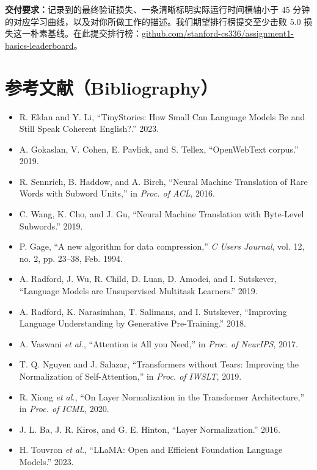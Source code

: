 \textbf{交付要求：}记录到的最终验证损失、一条清晰标明实际运行时间横轴小于 45 分钟的对应学习曲线，以及对你所做工作的描述。我们期望排行榜提交至少击败 5.0 损失这一朴素基线。在此提交排行榜：\url{github.com/stanford-cs336/assignment1-basics-leaderboard}。

\section*{参考文献（Bibliography）}

\begin{itemize}[leftmargin=3em, label={}]
  \item[\tm{[1]}] R. Eldan and Y. Li, ``TinyStories: How Small Can Language Models Be and Still Speak Coherent English?.'' 2023.
  \item[\tm{[2]}] A. Gokaslan, V. Cohen, E. Pavlick, and S. Tellex, ``OpenWebText corpus.'' 2019.
  \item[\tm{[3]}] R. Sennrich, B. Haddow, and A. Birch, ``Neural Machine Translation of Rare Words with Subword Units,'' in \textit{Proc. of ACL}, 2016.
  \item[\tm{[4]}] C. Wang, K. Cho, and J. Gu, ``Neural Machine Translation with Byte-Level Subwords.'' 2019.
  \item[\tm{[5]}] P. Gage, ``A new algorithm for data compression,'' \textit{C Users Journal}, vol. 12, no. 2, pp. 23--38, Feb. 1994.
  \item[\tm{[6]}] A. Radford, J. Wu, R. Child, D. Luan, D. Amodei, and I. Sutskever, ``Language Models are Unsupervised Multitask Learners.'' 2019.
  \item[\tm{[7]}] A. Radford, K. Narasimhan, T. Salimans, and I. Sutskever, ``Improving Language Understanding by Generative Pre-Training.'' 2018.
  \item[\tm{[8]}] A. Vaswani \textit{et al.}, ``Attention is All you Need,'' in \textit{Proc. of NeurIPS}, 2017.
  \item[\tm{[9]}] T. Q. Nguyen and J. Salazar, ``Transformers without Tears: Improving the Normalization of Self-Attention,'' in \textit{Proc. of IWSLT}, 2019.
  \item[\tm{[10]}] R. Xiong \textit{et al.}, ``On Layer Normalization in the Transformer Architecture,'' in \textit{Proc. of ICML}, 2020.
  \item[\tm{[11]}] J. L. Ba, J. R. Kiros, and G. E. Hinton, ``Layer Normalization.'' 2016.
  \item[\tm{[12]}] H. Touvron \textit{et al.}, ``LLaMA: Open and Efficient Foundation Language Models.'' 2023.

\end{itemize}
